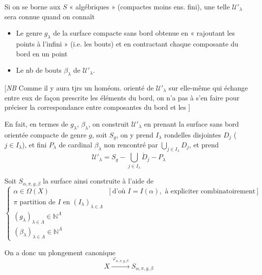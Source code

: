\documentclass[11pt,a4paper]{article}
\begin{document}
Si on se borne aux $S$ « algébriques » (compactes moins ens. fini), une telle
$\mathcal{U}'_{\lambda}$ sera connue quand on connaît
\begin{itemize}
  \item[a)] Le genre $g_{\lambda}$ de la surface compacte sans bord obtenue en
  « rajoutant les points à l'infini » (i.e. les bouts) et en contractant
  chaque composante du bord en un point
  \item[b)] Le nb de bouts $\beta_{\lambda}$ de $\mathcal{U}'_{\lambda}$.
\end{itemize}

[\emph{NB} Comme il y aura tjrs un homéom. orienté de $\mathcal{U}'_{\lambda}$
sur elle-même  qui échange entre
eux de façon prescrite les éléments du bord, on n'a pas à s'en faire pour
préciser la correspondance entre \struck{\ill{}} composantes du bord et les
]

En fait, en termes de $g_{\lambda}$, $\beta_{\lambda}$, on construit
$\mathcal{U}'_{\lambda}$ en prenant la surface \struck{\ill{}} sans bord
orientée compacte de genre $g$, soit $S_g$, on y prend $I_{\lambda}$
rondelles disjointes $D_j$ ($j \in I_{\lambda}$), et \struck{\ill{}}
  fini $P_{\lambda}$
de cardinal $\beta_{\lambda}$ non rencontré par
$\bigcup_{j \in I_{\lambda}} D_j$, et prend
\[
\mathcal{U}'_{\lambda} = S_g - \bigcup_{j \in I_{\lambda}} \mathring{D}_j - P_{\lambda}
\]


Soit $S_{\alpha, \pi, g, \beta}$ la surface ainsi construite à l'aide de
\[
\begin{cases}
\alpha \in \Omega(X) & [\text{d'où } I = I(\alpha), \text{ à expliciter combinatoirement}] \\
\pi \text{ partition de } I \text{ en } (I_{\lambda})_{\lambda \in \Lambda} & \\
(g_{\lambda})_{\lambda \in \Lambda} \in \mathbb{N}^{\Lambda} & \\
(\beta_{\lambda})_{\lambda \in \Lambda} \in \mathbb{N}^{\Lambda} &
\end{cases}
\]

On a donc un plongement canonique
\[
X \xrightarrow{\ \varphi_{\alpha, \pi, g, \beta}\ } S_{\alpha, \pi, g, \beta}
\]
\end{document}
